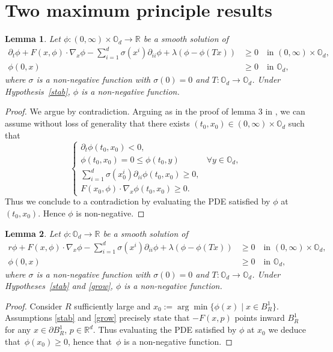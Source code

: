 \documentclass[JEP,XML,SOM,Unicode,NoEqCountersInSection,published]{cedram}
\newcommand{\argmin}{\arg\min}
\let\sep\mid
\newtheorem{Lemma}{Lemma}[section]
\theoremstyle{definition}
\begin{document}
\section{Two maximum principle results}\label{app:A}
\begin{Lemma}\label{max1}
Let $\phi: (0,\infty)\times \mathbb{O}_d \to \mathbb{R}$ be a smooth solution of
\begin{align*}
\partial_t \phi+F(x,\phi)\cdot\nabla_x \phi-\sum_{i =1}^d \sigma(x^i)\partial_{ii} \phi+\lambda(\phi-\phi(Tx)) &\geq 0 \quad\text{in } (0,\infty)\times \mathbb{O}_d,\\[-3pt]
\phi(0,x)&\geq 0 \quad\text{in } \mathbb{O}_d,
\end{align*}
where $\sigma$ is a non-negative function with $\sigma (0) = 0$ and $T: \mathbb{O}_d \to \mathbb{O}_d$. Under Hypothesis~\ref{stab}, $\phi$ is a non-negative function.
\end{Lemma}
\begin{proof}
We argue by contradiction. Arguing as in the proof of lemma 3 in \cite{bertucci2019some}, we can assume without loss of generality that there exists $(t_0,x_0) \in (0,\infty)\times \mathbb{O}_d$ such that
\begin{equation*}
\begin{cases}
\partial_t \phi (t_0,x_0) < 0,\\
\phi(t_0,x_0) = 0 \leq \phi(t_0,y)& \forall y \in \mathbb{O}_d,\\
\sum_{i =1}^d \sigma(x_0^i)\partial_{ii} \phi(t_0,x_0) \geq 0,\\
F(x_0,\phi)\cdot\nabla_x \phi (t_0,x_0) \geq 0.
\end{cases}
\end{equation*}
Thus we conclude to a contradiction by evaluating the PDE satisfied by $\phi$ at $(t_0,x_0)$. Hence $\phi$ is non-negative.
\end{proof}
\begin{Lemma}\label{max2}
Let $\phi: \mathbb{O}_d \to \mathbb{R}$ be a smooth solution of
\begin{align*}
r \phi+F(x,\phi)\cdot\nabla_x \phi-\sum_{i =1}^d \sigma(x^i)\partial_{ii} \phi+\lambda(\phi-\phi(Tx)) &\geq 0 \quad\text{in } (0,\infty)\times \mathbb{O}_d,\\[-3pt]
\phi(0,x) &\geq 0 \quad\text{in } \mathbb{O}_d,
\end{align*}
where $\sigma$ is a non-negative function with $\sigma (0) = 0$ and $T: \mathbb{O}_d \to \mathbb{O}_d$. Under Hypotheses~\ref{stab} and \ref{grow}, $\phi$ is a non-negative function.
\end{Lemma}
\begin{proof}
Consider $R$ sufficiently large and $x_0:= \argmin\{\phi(x) \sep x \in B^1_R\}$. Assumptions \ref{stab} and \ref{grow} precisely state that $-F(x,p)$ points inward $B^1_R$ for any $x \in \partial B^1_R$, $p \in \mathbb{R}^d$. Thus evaluating the PDE satisfied by $\phi$ at $x_0$ we deduce that~$\phi(x_0) \geq 0$, hence that~$\phi$ is a non-negative function.
\end{proof}
\end{document}
